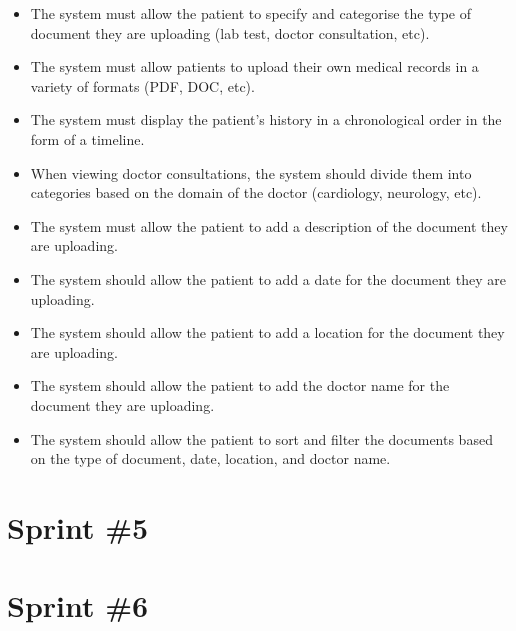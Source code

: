 \begin{itemize}
  \item The system must allow the patient to specify and categorise the type of document they are uploading (lab test, doctor consultation, etc).
  \item The system must allow patients to upload their own medical records in a variety of formats (PDF, DOC, etc).
  \item The system must display the patient's history in a chronological order in the form of a timeline.
  \item When viewing doctor consultations, the system should divide them into categories based on the domain of the doctor (cardiology, neurology, etc).
  \item The system must allow the patient to add a description of the document they are uploading.
  \item The system should allow the patient to add a date for the document they are uploading.
  \item The system should allow the patient to add a location for the document they are uploading.
  \item The system should allow the patient to add the doctor name for the document they are uploading.
  \item The system should allow the patient to sort and filter the documents based on the type of document, date, location, and doctor name. 
\end{itemize}

\section{Sprint \#5}

\section{Sprint \#6}